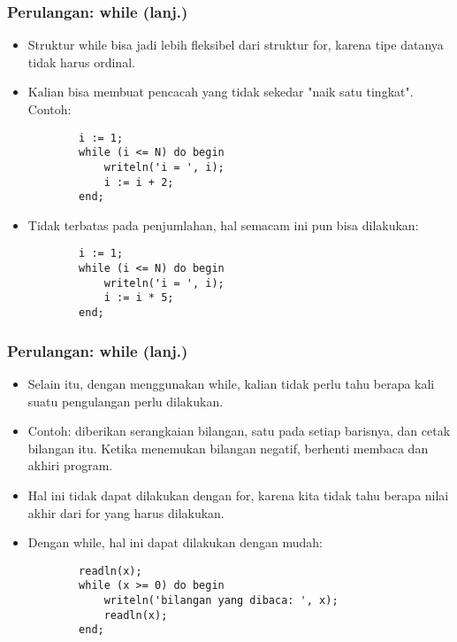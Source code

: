 \documentclass{beamer}
\begin{document}
\begin{frame}[fragile]
\frametitle{Perulangan: while (lanj.)} 
\begin{itemize}
	\item Struktur while bisa jadi lebih fleksibel dari struktur for, karena tipe datanya tidak harus ordinal.
	\item Kalian bisa membuat pencacah yang tidak sekedar "naik satu tingkat". Contoh:
	\begin{lstlisting}
		i := 1;
		while (i <= N) do begin
		    writeln('i = ', i);
		    i := i + 2;
		end;
	\end{lstlisting}
	
	\item Tidak terbatas pada penjumlahan, hal semacam ini pun bisa dilakukan:
	\begin{lstlisting}
		i := 1;
		while (i <= N) do begin
		    writeln('i = ', i);
		    i := i * 5;
		end;
	\end{lstlisting}
\end{itemize}
\end{frame}

\begin{frame}[fragile]
\frametitle{Perulangan: while (lanj.)} 
\begin{itemize}
	\item Selain itu, dengan menggunakan while, kalian tidak perlu tahu berapa kali suatu pengulangan perlu dilakukan.
	\item Contoh: diberikan serangkaian bilangan, satu pada setiap barisnya, dan cetak bilangan itu. Ketika menemukan bilangan negatif, berhenti membaca dan akhiri program.
	\item Hal ini tidak dapat dilakukan dengan for, karena kita tidak tahu berapa nilai akhir dari for yang harus dilakukan.
	\item Dengan while, hal ini dapat dilakukan dengan mudah:
	\begin{lstlisting}
		readln(x);
		while (x >= 0) do begin
		    writeln('bilangan yang dibaca: ', x);
		    readln(x);
		end;
	\end{lstlisting}
\end{itemize}
\end{frame}
\end{document}
